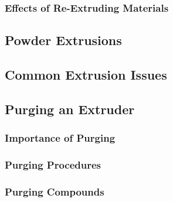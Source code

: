 \subsubsection{Effects of Re-Extruding Materials\label{sec:literatureReview:extrusion:regrindEffects}}

\subsection{Powder Extrusions\label{sec:literatureReview:extrusion:powder}}

\subsection{Common Extrusion Issues\label{sec:literatureReview:extrusion:issues}}

\subsection{Purging an Extruder\label{sec:literatureReview:extrusion:purging}}

\subsubsection{Importance of Purging\label{sec:literatureReview:extrusion:purgingImportance}}

\subsubsection{Purging Procedures\label{sec:literatureReview:extrusion:purgingProcedures}}

\subsubsection{Purging Compounds\label{sec:literatureReview:extrusion:purgingCompounds}}

